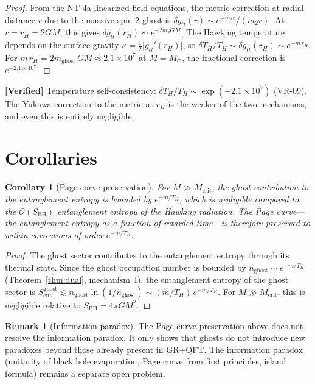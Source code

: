 \documentclass[11pt,a4paper]{article}
\newcommand{\order}{\mathcal{O}}
\newcommand{\Msun}{M_{\odot}}
\newcommand{\Mcrit}{M_{\mathrm{crit}}}
\newcommand{\mghost}{m_{\mathrm{ghost}}}
\newcommand{\Thr}{T_{\!\scriptscriptstyle H}}
\theoremstyle{plain}
\newtheorem{corollary}[theorem]{Corollary}
\theoremstyle{definition}
\newtheorem{remark}[theorem]{Remark}
\newcommand{\verified}[1]{%
  \par\smallskip\noindent
  \colorbox{green!10}{\parbox{\dimexpr\linewidth-2\fboxsep}{%
    \textcolor{green!50!black}{\textbf{[Verified]}} #1}}%
  \par\smallskip}
\begin{document}
\begin{proof}
  From the NT-4a linearized field equations, the metric correction at
  radial distance $r$ due to the massive spin-2 ghost is
  $\delta g_{tt}(r) \sim e^{-m_2 r}/(m_2 r)$.  At
  $r = r_H = 2GM$, this gives
  $\delta g_{tt}(r_H) \sim e^{-2m_2 GM}$.  The Hawking temperature
  depends on the surface gravity
  $\kappa = \tfrac{1}{2}\lvert g_{tt}'(r_H)\rvert$, so
  $\delta\Thr/\Thr \sim \delta g_{tt}(r_H) \sim e^{-m\,r_H}$.
  For $m\,r_H = 2\mghost\, GM \approx 2.1\times 10^{7}$ at
  $M=\Msun$, the fractional correction is $e^{-2.1\times 10^{7}}$.
\end{proof}

\verified{Temperature self-consistency: $\delta T_H/T_H \sim
\exp(-2.1\times 10^7)$ (VR-09).  The Yukawa correction to the
metric at $r_H$ is the weaker of the two mechanisms, and even
this is entirely negligible.}


\section{Corollaries}\label{sec:corollaries}

\begin{corollary}[Page curve preservation]\label{cor:page}
  For $M \gg \Mcrit$, the ghost contribution to the entanglement
  entropy is bounded by $e^{-m/\Thr}$, which is negligible compared
  to the $\order(S_{\mathrm{BH}})$ entanglement entropy of the
  Hawking radiation.  The Page curve---the entanglement entropy as a
  function of retarded time---is therefore preserved to within
  corrections of order $e^{-m/\Thr}$.
\end{corollary}

\begin{proof}
  The ghost sector contributes to the entanglement entropy through
  its thermal state.  Since the ghost occupation number is bounded by
  $n_{\mathrm{ghost}} \sim e^{-m/\Thr}$ (Theorem~\ref{thm:dual},
  mechanism~I), the entanglement entropy of the ghost sector is
  $S_{\mathrm{ent}}^{\mathrm{ghost}} \lesssim
  n_{\mathrm{ghost}}\ln(1/n_{\mathrm{ghost}})
  \sim (m/\Thr)\,e^{-m/\Thr}$.  For $M \gg \Mcrit$, this is
  negligible relative to $S_{\mathrm{BH}} = 4\pi G M^2$.
\end{proof}

\begin{remark}[Information paradox]\label{rem:info_paradox}
  The Page curve preservation above does not resolve the information
  paradox.  It only shows that ghosts do not introduce new paradoxes
  beyond those already present in GR+QFT.  The information paradox
  (unitarity of black hole evaporation, Page curve from first
  principles, island formula) remains a separate open problem.
\end{remark}
\end{document}
